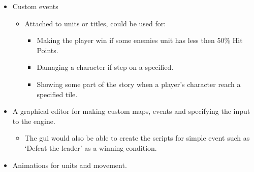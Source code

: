 \begin{itemize}
	\item Custom events
	\begin{itemize}
		\item Attached to units or titles, could be used for:
		\begin{itemize}
			\item Making the player win if some enemies unit has less then 50\% Hit Points.
			
			\item Damaging a character if step on a specified.
			
			\item Showing some part of the story when a player's character reach a specified tile.
		\end{itemize}
	\end{itemize}
	
	\item A graphical editor for making custom maps, events and specifying the input to the engine.
	\begin{itemize}
		\item The gui would also be able to create the scripts for simple event such as `Defeat the leader' as a winning condition.
	\end{itemize}
	\item Animations for units and movement.
\end{itemize}